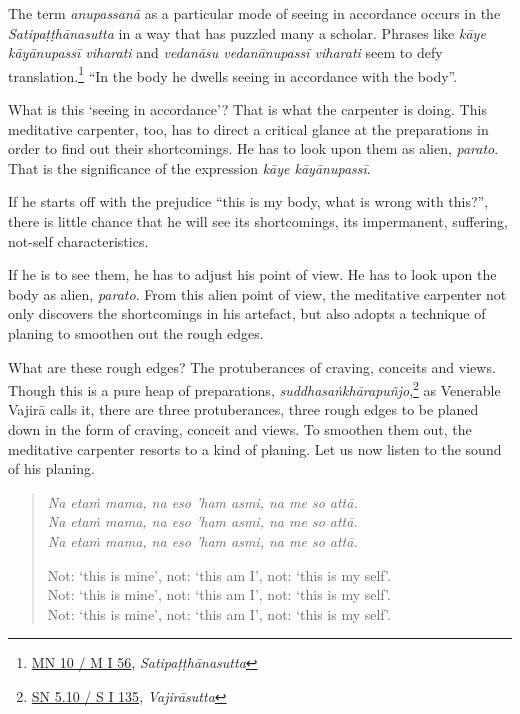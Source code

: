 The term \emph{anupassanā} as a particular mode of seeing in accordance occurs in the \emph{Satipaṭṭhānasutta} in a way that has puzzled many a scholar. Phrases like \emph{kāye kāyānupassī viharati} and \emph{vedanāsu vedanānupassī viharati} seem to defy translation.\footnote{\href{https://suttacentral.net/mn10/pli/ms}{MN 10 / M I 56}, \emph{Satipaṭṭhānasutta}} ``In the body he dwells seeing in accordance with the body''.

What is this `seeing in accordance'? That is what the carpenter is doing. This meditative carpenter, too, has to direct a critical glance at the preparations in order to find out their shortcomings. He has to look upon them as alien, \emph{parato}. That is the significance of the expression \emph{kāye kāyānupassī}.

If he starts off with the prejudice ``this is my body, what is wrong with this?'', there is little chance that he will see its shortcomings, its impermanent, suffering, not-self characteristics.

If he is to see them, he has to adjust his point of view. He has to look upon the body as alien, \emph{parato}. From this alien point of view, the meditative carpenter not only discovers the shortcomings in his artefact, but also adopts a technique of planing to smoothen out the rough edges.

What are these rough edges? The protuberances of craving, conceits and views. Though this is a pure heap of preparations, \emph{suddhasaṅkhārapuñjo},\footnote{\href{https://suttacentral.net/sn5.10/pli/ms}{SN 5.10 / S I 135}, \emph{Vajirāsutta}} as Venerable Vajirā calls it, there are three protuberances, three rough edges to be planed down in the form of craving, conceit and views. To smoothen them out, the meditative carpenter resorts to a kind of planing. Let us now listen to the sound of his planing.

\begin{quote}
\emph{Na etaṁ mama, na eso 'ham asmi, na me so attā.}\\
\emph{Na etaṁ mama, na eso 'ham asmi, na me so attā.}\\
\emph{Na etaṁ mama, na eso 'ham asmi, na me so attā.}

Not: `this is mine', not: `this am I', not: `this is my self'.\\
Not: `this is mine', not: `this am I', not: `this is my self'.\\
Not: `this is mine', not: `this am I', not: `this is my self'.
\end{quote}

